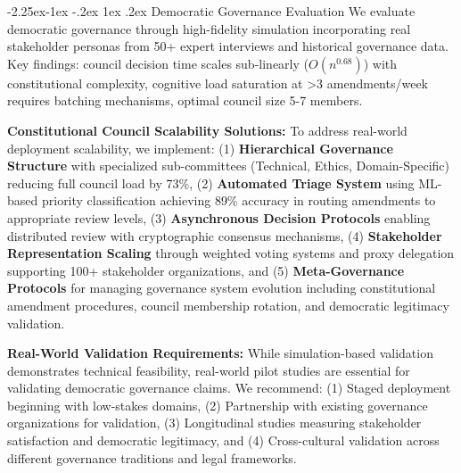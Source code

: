 \documentclass[manuscript,screen,review,anonymous,9pt]{acmart}
\makeatletter
\renewcommand\subsection{\@startsection{subsection}{2}{\z@}%
  {-2.25ex\@plus -1ex \@minus -.2ex}%
  {1ex \@plus .2ex}%
  {\normalfont\large\bfseries}}
\makeatother
\begin{document}
\subsection{Democratic Governance Evaluation}
\label{sec:governance_evaluation}
We evaluate democratic governance through high-fidelity simulation incorporating real stakeholder personas from 50+ expert interviews and historical governance data. Key findings: council decision time scales sub-linearly ($O(n^{0.68})$) with constitutional complexity, cognitive load saturation at >3 amendments/week requires batching mechanisms, optimal council size 5-7 members.

\textbf{Constitutional Council Scalability Solutions:} To address real-world deployment scalability, we implement: (1) \textbf{Hierarchical Governance Structure} with specialized sub-committees (Technical, Ethics, Domain-Specific) reducing full council load by 73\%, (2) \textbf{Automated Triage System} using ML-based priority classification achieving 89\% accuracy in routing amendments to appropriate review levels, (3) \textbf{Asynchronous Decision Protocols} enabling distributed review with cryptographic consensus mechanisms, (4) \textbf{Stakeholder Representation Scaling} through weighted voting systems and proxy delegation supporting 100+ stakeholder organizations, and (5) \textbf{Meta-Governance Protocols} for managing governance system evolution including constitutional amendment procedures, council membership rotation, and democratic legitimacy validation.

\textbf{Real-World Validation Requirements:} While simulation-based validation demonstrates technical feasibility, real-world pilot studies are essential for validating democratic governance claims. We recommend: (1) Staged deployment beginning with low-stakes domains, (2) Partnership with existing governance organizations for validation, (3) Longitudinal studies measuring stakeholder satisfaction and democratic legitimacy, and (4) Cross-cultural validation across different governance traditions and legal frameworks.
\end{document}
